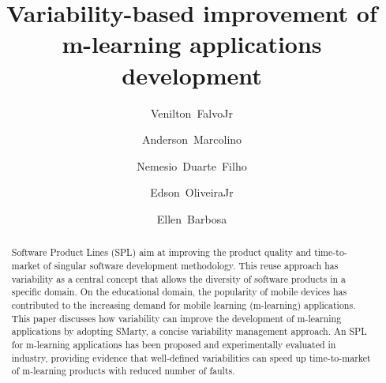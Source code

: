 \documentclass[preprint,12pt]{elsarticle}
\begin{document}
\begin{frontmatter}



\title{Variability-based improvement of m-learning applications development}


\author[usp]{Venilton~FalvoJr}
\author[usp]{Anderson~Marcolino}
\author[usp]{Nemesio~Duarte~Filho}
\author[uem]{Edson~OliveiraJr}
\author[usp]{Ellen~Barbosa}


\address[usp]{University of S\~ao Paulo (USP), Brazil}
\address[uem]{State University of Maring\'a (UEM), Brazil}

\begin{abstract}
Software Product Lines (SPL) aim at improving the product quality and time-to-market of singular software development methodology. This reuse approach has variability as a central concept that allows the diversity of software products in a specific domain. On the educational domain, the popularity of mobile devices has contributed to the increasing demand for mobile learning (m-learning) applications. This paper discusses how variability can improve the development of m-learning applications by adopting SMarty, a concise variability management approach. An SPL for m-learning applications has been proposed and experimentally evaluated in industry, providing evidence that well-defined variabilities can speed up time-to-market of m-learning products with reduced number of faults.
\end{abstract}


\end{frontmatter}
\end{document}
